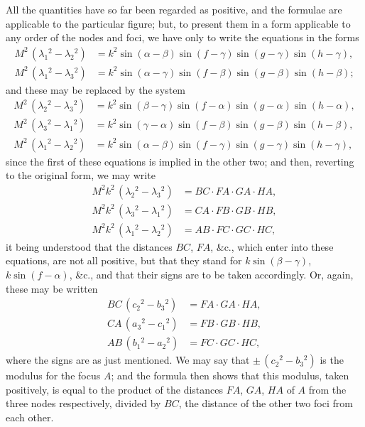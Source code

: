 \documentclass[11pt,a4paper]{book}
\begin{document}
\noindent
All the quantities have so far been regarded as positive, and the formulae are applicable to the particular figure; but, to present them in a form applicable to any order of the nodes and foci, we have only to write the equations in the forms
\begin{align*}
M^2\, (\lambda_1{}^{\!2} - \lambda_2{}^{\!2}) &= k^2 \sin(\alpha-\beta) \sin(f-\gamma) \sin(g-\gamma) \sin(h-\gamma), \\
M^2\, (\lambda_1{}^{\!2} - \lambda_3{}^{\!2}) &= k^2 \sin(\alpha-\gamma) \sin(f-\beta) \sin(g-\beta) \sin(h-\beta);
\end{align*}
and these may be replaced by the system
\begin{align*}
M^2\, (\lambda_2{}^{\!2} - \lambda_3{}^{\!2}) &= k^2 \sin(\beta-\gamma) \sin(f-\alpha) \sin(g-\alpha) \sin(h-\alpha), \\
M^2\, (\lambda_3{}^{\!2} - \lambda_1{}^{\!2}) &= k^2 \sin(\gamma-\alpha) \sin(f-\beta) \sin(g-\beta) \sin(h-\beta), \\
M^2\, (\lambda_1{}^{\!2} - \lambda_2{}^{\!2}) &= k^2 \sin(\alpha-\beta) \sin(f-\gamma) \sin(g-\gamma) \sin(h-\gamma),
\end{align*}
since the first of these equations is implied in the other two; and then, reverting to the original form, we may write
\begin{align*}
M^2 k^2\, (\lambda_2{}^{\!2} - \lambda_3{}^{\!2}) &= BC \cdot FA \cdot GA \cdot HA, \\
M^2 k^2\, (\lambda_3{}^{\!2} - \lambda_1{}^{\!2}) &= CA \cdot FB \cdot GB \cdot HB, \\
M^2 k^2\, (\lambda_1{}^{\!2} - \lambda_2{}^{\!2}) &= AB \cdot FC \cdot GC \cdot HC,
\end{align*}
it being understood that the distances $BC$, $FA$, \&c., which enter into these equations, are not all positive, but that they stand for $k\sin(\beta-\gamma)$, $k\sin(f-\alpha)$, \&c., and that their signs are to be taken accordingly. Or, again, these may be written
\begin{align*}
BC\, (c_2{}^{\!2} - b_3{}^{\!2}) &= FA \cdot GA \cdot HA, \\
CA\, (a_3{}^{\!2} - c_1{}^{\!2}) &= FB \cdot GB \cdot HB, \\
AB\, (b_1{}^{\!2} - a_2{}^{\!2}) &= FC \cdot GC \cdot HC,
\end{align*}
where the signs are as just mentioned. We may say that $\pm\,(c_2{}^{\!2}-b_3{}^{\!2})$ is the modulus for the focus $A$; and the formula then shows that this modulus, taken positively, is equal to the product of the distances $FA$, $GA$, $HA$ of $A$ from the three nodes respectively, divided by $BC$, the distance of the other two foci from each other.
\end{document}

